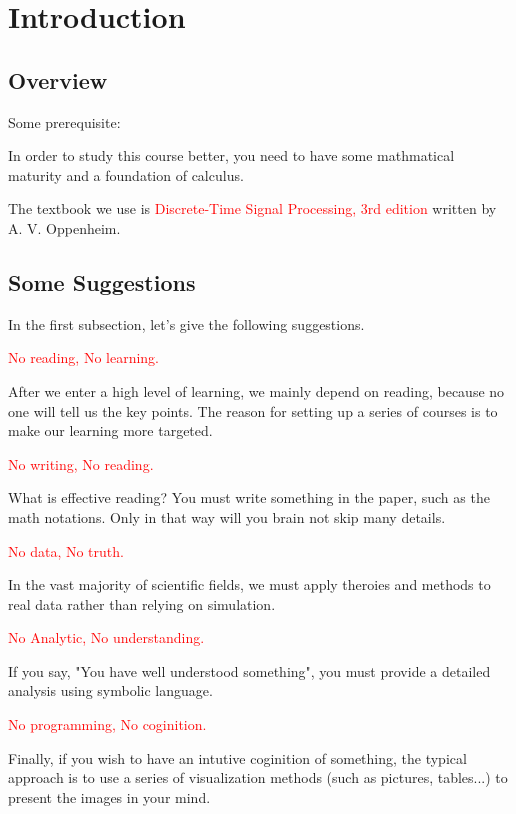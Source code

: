 \section{Introduction}
    \subsection{Overview}
        Some prerequisite:


        In order to study this course better, 
        you need to have some mathmatical maturity and a foundation of calculus.
        
        The textbook we use is \textcolor{red}{Discrete-Time Signal Processing, 3rd edition} written by A. V. Oppenheim.


    \subsection{Some Suggestions}
        In the first subsection, let's give the following suggestions.

        \noindent \textcolor{red}{No reading, No learning.}

        After we enter a high level of learning, we mainly depend on reading,
        because no one will tell us the key points. 
        The reason for setting up a series of courses is to make our learning more targeted.

        \noindent \textcolor{red}{No writing, No reading.}

        What is effective reading? You must write something in the paper, such as the math notations.
        Only in that way will you brain not skip many details.
        
        \noindent \textcolor{red}{No data, No truth.}

        In the vast majority of scientific fields, 
        we must apply theroies and methods to real data rather than relying on simulation.
        
        \noindent \textcolor{red}{No Analytic, No understanding.}

        If you say, "You have well understood something", you must provide a detailed analysis
        {using symbolic language}.
        
        \noindent \textcolor{red}{No programming, No coginition.}

        Finally, if you wish to have an intutive coginition of something, 
        the typical approach is to use a series of visualization methods (such as pictures, tables...) to present the images in your mind.

